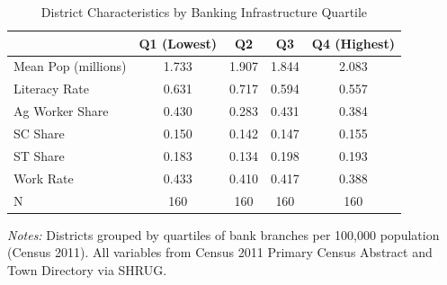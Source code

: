 \begin{table}[htbp]
\centering
\caption{District Characteristics by Banking Infrastructure Quartile}
\label{tab:balance}
\small
\begin{tabular}{lcccc}
\hline\hline
 & Q1 (Lowest) & Q2 & Q3 & Q4 (Highest) \\
\hline
Mean Pop (millions)       & 1.733 & 1.907 & 1.844 & 2.083 \\
Literacy Rate             & 0.631 & 0.717 & 0.594 & 0.557 \\
Ag Worker Share           & 0.430 & 0.283 & 0.431 & 0.384 \\
SC Share                  & 0.150 & 0.142 & 0.147 & 0.155 \\
ST Share                  & 0.183 & 0.134 & 0.198 & 0.193 \\
Work Rate                 & 0.433 & 0.410 & 0.417 & 0.388 \\
N                         & 160 & 160 & 160 & 160 \\
\hline\hline
\end{tabular}
\begin{minipage}{0.85\textwidth}
\footnotesize
\textit{Notes:} Districts grouped by quartiles of bank branches per 100,000 population (Census 2011).
All variables from Census 2011 Primary Census Abstract and Town Directory via SHRUG.
\end{minipage}
\end{table}
